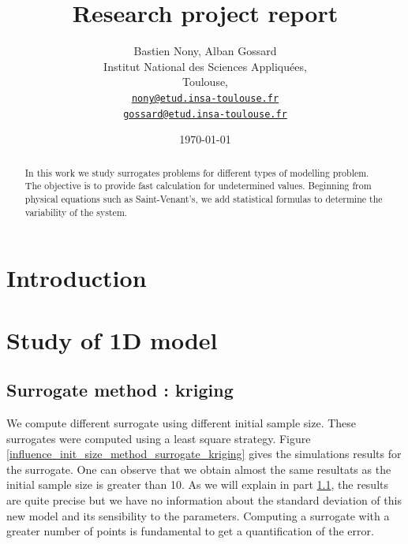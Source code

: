 \documentclass[hidelinks,12pt]{article}
\begin{document}
\title{Research project report}
\author{Bastien Nony, Alban Gossard\\
Institut National des Sciences Appliquées,\\
Toulouse,\\
\href{mailto:nony@etud.insa-toulouse.fr}{   \texttt{nony@etud.insa-toulouse.fr}}\\
\href{mailto:gossard@etud.insa-toulouse.fr}{   \texttt{gossard@etud.insa-toulouse.fr}}}
\date{\today}

\maketitle

\begin{abstract}
In this work we study surrogates problems for different types of modelling problem. The objective is to provide fast calculation for undetermined values. Beginning from physical equations such as Saint-Venant's, we add statistical formulas to determine the variability of the system.
\end{abstract}

\tableofcontents


\section*{Introduction}



\section{Study of 1D model}

\subsection{Surrogate method : kriging}

We compute different surrogate using different initial sample size. These surrogates were computed using a least square strategy. Figure \ref{influence_init_size_method_surrogate_kriging} gives the simulations results for the surrogate. One can observe that we obtain almost the same resultats as the initial sample size is greater than 10. As we will explain in part \ref{}, the results are quite precise but we have no information about the standard deviation of this new model and its sensibility to the parameters. Computing a surrogate with a greater number of points is fundamental to get a quantification of the error.
\end{document}
